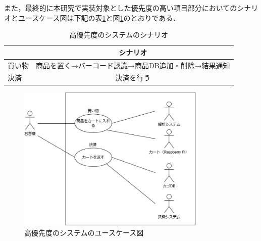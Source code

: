 また，最終的に本研究で実装対象とした優先度の高い項目部分においてのシナリオとユースケース図は下記の表\ref{sina}と図\ref{use}のとおりである．



\begin{table}[htb]
\begin{center}
\caption{高優先度のシステムのシナリオ}
\begin{tabular}{|l|c|} \hline
 & シナリオ \\ \hline \hline
買い物 & 商品を置く→バーコード認識→商品DB追加・削除→結果通知 \\
決済 & 決済を行う \\ \hline
\end{tabular}
\label{sina}
\end{center}
\end{table}


\begin{figure}[htbp]
\centering
\includegraphics[width = 9cm]{./picture/usecase_saishu.eps}
\caption{高優先度のシステムのユースケース図}
\label{use}
\end{figure}